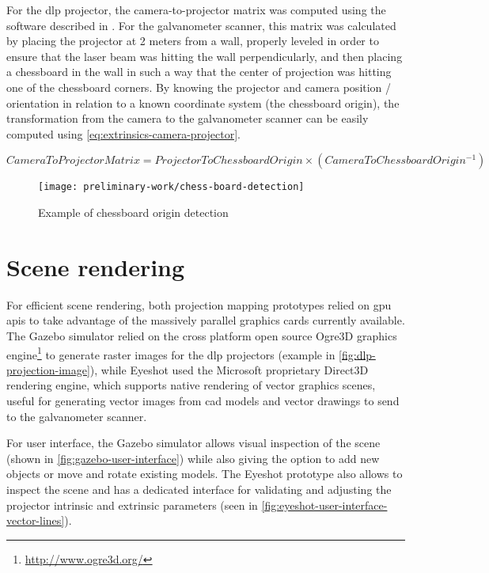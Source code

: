 For the \gls{dlp} projector, the camera-to-projector matrix was computed using the software described in \cite{Moreno2012}. For the galvanometer scanner, this matrix was calculated by placing the projector at 2 meters from a wall, properly leveled in order to ensure that the laser beam was hitting the wall perpendicularly, and then placing a chessboard in the wall in such a way that the center of projection was hitting one of the chessboard corners. By knowing the projector and camera position / orientation in relation to a known coordinate system (the chessboard origin), the transformation from the camera to the galvanometer scanner can be easily computed using \cref{eq:extrinsics-camera-projector}.

\begin{small}
	\begin{equation}\label{eq:extrinsics-camera-projector}
		CameraToProjectorMatrix = ProjectorToChessboardOrigin \times (CameraToChessboardOrigin^{-1})
	\end{equation}
\end{small}

\begin{figure}[H]
	\centering
	\texttt{[image: preliminary-work/chess-board-detection]}
	\caption{Example of chessboard origin detection}
	\label{fig:chess-board-detection}
\end{figure}



\section{Scene rendering}

For efficient scene rendering, both projection mapping prototypes relied on \gls{gpu} \glspl{api} to take advantage of the massively parallel graphics cards currently available. The Gazebo simulator relied on the cross platform open source Ogre3D graphics engine\footnote{\url{http://www.ogre3d.org/}} to generate raster images for the \gls{dlp} projectors (example in \cref{fig:dlp-projection-image}), while Eyeshot used the Microsoft proprietary Direct3D rendering engine, which supports native rendering of vector graphics scenes, useful for generating vector images from \gls{cad} models and vector drawings to send to the galvanometer scanner.

For user interface, the Gazebo simulator allows visual inspection of the scene (shown in \cref{fig:gazebo-user-interface}) while also giving the option to add new objects or move and rotate existing models. The Eyeshot prototype also allows to inspect the scene and has a dedicated interface for validating and adjusting the projector intrinsic and extrinsic parameters (seen in \cref{fig:eyeshot-user-interface-vector-lines}).

